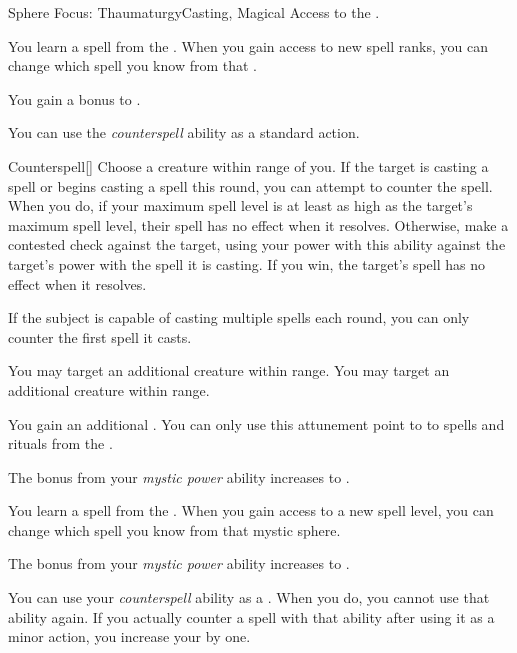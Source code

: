     \begin{feat}{Sphere Focus: Thaumaturgy}{Casting, Magical}
        \featpre Access to the  .

         You learn a spell from the  .
        When you gain access to new spell ranks, you can change which spell you know from that .

         You gain a  bonus to  .

         You can use the \textit{counterspell} ability as a standard action.
        \begin{freeability}{Counterspell}[]
            Choose a creature within \rngmed range of you.
            If the target is casting a spell or begins casting a spell this round, you can attempt to counter the spell.
            When you do, if your maximum spell level is at least as high as the target's maximum spell level, their spell has no effect when it resolves.
            Otherwise, make a contested  check against the target, using your power with this ability against the target's power with the spell it is casting.
            If you win, the target's spell has no effect when it resolves.

            If the subject is capable of casting multiple spells each round, you can only counter the first spell it casts.

            \rankline
             You may target an additional creature within range.
             You may target an additional creature within range.
        \end{freeability}

         You gain an additional .
        You can only use this attunement point to  to spells and rituals from the  .

         The bonus from your \textit{mystic power} ability increases to .

         You learn a spell from the  .
        When you gain access to a new spell level, you can change which spell you know from that mystic sphere.

         The bonus from your \textit{mystic power} ability increases to .

         You can use your \textit{counterspell} ability as a .
        When you do, you  cannot use that ability again.
        If you actually counter a spell with that ability after using it as a minor action, you increase your  by one.
    \end{feat}

